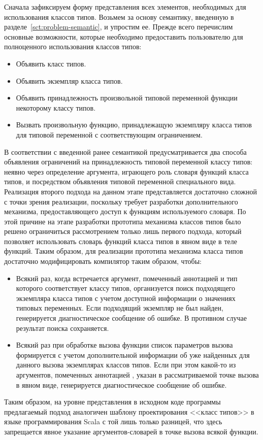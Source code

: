 Сначала зафиксируем форму представления всех элементов, необходимых для использования классов типов. Возьмем за основу семантику, введенную в разделе~\ref{sct:problem-semantic}, и упростим ее. Прежде всего перечислим основные возможности, которые необходимо предоставить пользователю для полноценного использования классов типов:
\begin{itemize}    
    \item Объявить класс типов.
    \item Объявить экземпляр класса типов.
    \item Объявить принадлежность произвольной типовой переменной функции некоторому классу типов.
    \item Вызвать произвольную функцию, принадлежащую экземпляру класса типов для типовой переменной с соответствующим ограничением.   
\end{itemize}
В соответствии с введенной ранее семантикой предусматривается два способа объявления ограничений на принадлежность типовой переменной классу типов: неявно через определение аргумента, играющего роль словаря функций класса типов, и посредством объявления типовой переменной специального вида. Реализация второго подхода на данном этапе представляется достаточно сложной с точки зрения реализации, поскольку требует разработки дополнительного механизма, предоставляющего доступ к функциям используемого словаря. По этой причине на этапе разработки прототипа механизма классов типов было решено ограничиться рассмотрением только лишь первого подхода, который позволяет использовать словарь функций класса типов в явном виде в теле функций. Таким образом, для реализации прототипа механизма класса типов достаточно модифицировать компилятор таким образом, чтобы:
\begin{itemize}
    \item Всякий раз, когда встречается аргумент, помеченный аннотацией  и тип которого соответствует классу типов, организуется поиск подходящего экземпляра класса типов с учетом доступной информации о значениях типовых переменных. Если подходящий экземпляр не был найден, генерируется диагностическое сообщение об ошибке. В противном случае результат поиска сохраняется.
    \item Всякий раз при обработке вызова функции список параметров вызова формируется с учетом дополнительной информации об уже найденных для данного вызова экземплярах классов типов. Если при этом какой-то из аргументов, помеченных аннотацией , указан в рассматриваемой точке вызова в явном виде, генерируется диагностическое сообщение об ошибке.
\end{itemize}
Таким образом, на уровне представления в исходном коде программы предлагаемый подход аналогичен шаблону проектирования <<класс типов>> в языке программирования Scala с той лишь только разницей, что здесь запрещается явное указание аргументов-словарей в точке вызова всякой функции. 

